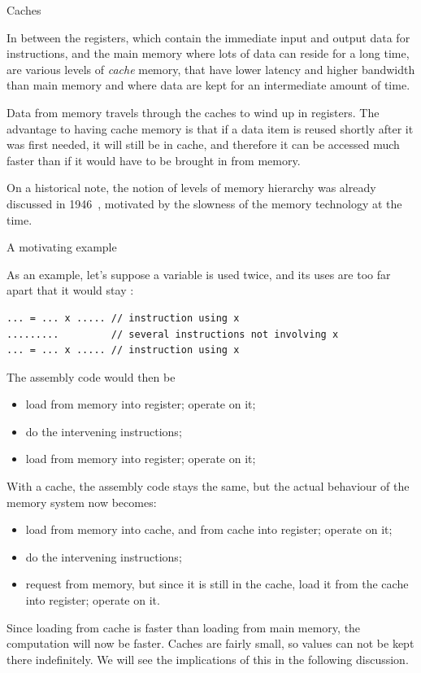 
 {Caches}
\label{sec:cache}

In between the registers, which contain the immediate input and output
data for instructions, and the main memory where lots of data can reside for a
long time, are various levels of \emph{cache} memory, that have
lower latency and higher bandwidth than main memory and where data are
kept for an intermediate amount of time.  

Data from
memory travels through the caches to wind up in registers. The
advantage to having cache memory is that if a data item is reused
shortly after it was first needed, it will still be in cache, and
therefore it can be accessed much faster than if it would have to be
brought in from memory.

On a historical note, the notion of levels of memory hierarchy was
already discussed in 1946~\cite{Burks:discussion}, motivated
by the slowness of the memory technology at the time.

 {A motivating example}

As an example, let's suppose a variable  is used twice, and its
uses are too far apart that it would stay :
\begin{verbatim}
... = ... x ..... // instruction using x
.........         // several instructions not involving x
... = ... x ..... // instruction using x
\end{verbatim}
The assembly code would then be
\begin{itemize}
\item load  from memory into register; operate on it;
\item do the intervening instructions;
\item load  from memory into register; operate on it;
\end{itemize}
With a cache, the assembly code stays the same, but the actual
behaviour of the memory system now becomes:
\begin{itemize}
\item load  from memory into cache, and from cache into register;
  operate on it;
\item do the intervening instructions;
\item request  from memory, but since it is still in the cache,
  load it from the cache into register; operate on it.
\end{itemize}
Since loading from cache is faster than loading from main memory, the
computation will now be faster. Caches are fairly small, so values
can not be kept there indefinitely. We will see the implications of
this in the following discussion.

